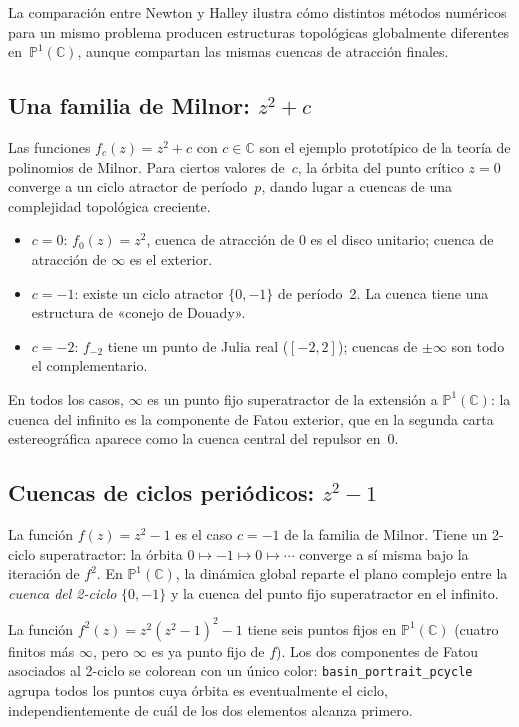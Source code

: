 \documentclass[11pt,a4paper]{article}
\theoremstyle{plain}
\theoremstyle{definition}
\theoremstyle{remark}
\newcommand{\C}{\mathbb{C}}
\newcommand{\Puno}{\mathbb{P}^1(\mathbb{C})}
\newcommand{\fn}[1]{\texttt{#1}}
\begin{document}
La comparación entre Newton y Halley ilustra cómo distintos métodos
numéricos para un mismo problema producen estructuras topológicas
globalmente diferentes en~$\Puno$, aunque compartan las mismas
cuencas de atracción finales.

\subsection{Una familia de Milnor: \texorpdfstring{$z^2+c$}{z2+c}}

Las funciones $f_c(z)=z^2+c$ con $c\in\C$ son el ejemplo prototípico
de la teoría de polinomios de Milnor.
Para ciertos valores de~$c$, la órbita del punto crítico $z=0$ converge
a un ciclo atractor de período~$p$, dando lugar a cuencas de una
complejidad topológica creciente.

\begin{itemize}
  \item $c=0$: $f_0(z)=z^2$, cuenca de atracción de $0$ es el disco
        unitario; cuenca de atracción de $\infty$ es el exterior.
  \item $c=-1$: existe un ciclo atractor $\{0,-1\}$ de período~2.
        La cuenca tiene una estructura de «conejo de Douady».
  \item $c=-2$: $f_{-2}$ tiene un punto de Julia real ($[-2,2]$);
        cuencas de $\pm\infty$ son todo el complementario.
\end{itemize}

En todos los casos, $\infty$ es un punto fijo superatractor de la
extensión a $\Puno$: la cuenca del infinito es la componente de Fatou
exterior, que en la segunda carta estereográfica aparece como la cuenca
central del repulsor en~$0$.

\subsection{Cuencas de ciclos periódicos: \texorpdfstring{$z^2-1$}{z2-1}}
\label{ssec:pcycle_z2}

La función $f(z)=z^2-1$ es el caso $c=-1$ de la familia de Milnor.
Tiene un 2-ciclo superatractor: la órbita $0\mapsto -1\mapsto 0\mapsto\cdots$
converge a sí misma bajo la iteración de $f^2$.
En $\Puno$, la dinámica global reparte el plano complejo entre la
\emph{cuenca del 2-ciclo} $\{0,-1\}$ y la cuenca del punto fijo superatractor
en el infinito.

La función $f^2(z)=z^2(z^2-1)^2-1$ tiene seis puntos fijos en $\Puno$
(cuatro finitos más $\infty$, pero $\infty$ es ya punto fijo de $f$).
Los dos componentes de Fatou asociados al 2-ciclo se colorean con un único
color: \fn{basin\_portrait\_pcycle} agrupa todos los puntos cuya órbita
es eventualmente el ciclo, independientemente de cuál de los dos
elementos alcanza primero.
\end{document}
